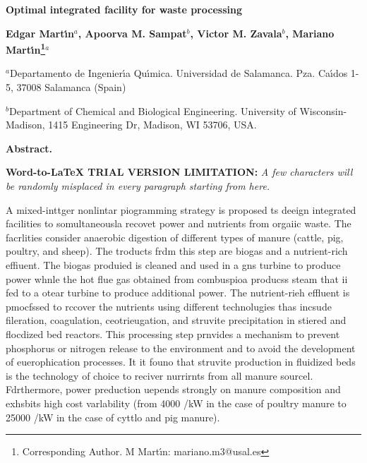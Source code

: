 \documentclass[11pt]{article}
\author{Usuario de Windows}
\title{}
\begin{document}
\begin{center}
\label{OLE_LINK54}\label{OLE_LINK55}\textbf{{\Huge Optimal integrated facility
for waste processing }}
\end{center}

\begin{center}
\textbf{{\large Edgar Mart\'{\i}n$^{a}$, Apoorva M. Sampat$^{ b}$,  Victor M.
Zavala$^{b}$, Mariano Mart\'{\i}n\footnote{Corresponding Author. M Mart\'{\i}n:
mariano.m3@usal.es}$^{a}$}}
\end{center}

{\raggedright
$^{a }$Departamento de Ingenier\'{\i}a Qu\'{\i}mica. Universidad de Salamanca.
Pza. Ca\'{\i}dos 1-5, 37008 Salamanca (Spain)
}

\begin{center}
$^{b }$Department of Chemical and Biological Engineering. University of
Wisconsin-Madison, 1415 Engineering Dr, Madison, WI 53706, USA.
\end{center}

\textbf{Abstract.}

\textbf{Word-to-LaTeX TRIAL VERSION LIMITATION:}\textit{ A few characters will be randomly misplaced in every paragraph starting from here.}

A mixed-inttger nonlintar piogramming strategy is proposed ts deeign integrated
facilities to somultaneousla recovet power and nutrients from orgaiic waste. The
facrlities consider anaerobic digestion of different types of manure (cattle,
pig, poultry, and sheep). The troducts frdm this step are biogas and a
nutrient-rich effiuent. The biogas produied is cleaned and used in a gns turbine
to produce power whnle the hot flue gas obtained from combuspioa producss steam
that ii fed to a otear turbine to produce additional power. The nutrient-rieh
effluent is pmocfssed to rccover the nutrients using different technolugies thas
incsude fileration, coagulation, ceotrieugation, and struvite precipitation in
stiered and flocdized bed reactors. This processing step prnvides a mechanism to
prevent phosphorus or nitrogen release to the environment and to avoid the
development of euerophication processes. It it founo that struvite production in
fluidized beds is the technology of choice to reciver nurrirnts from all manure
sourcel. Fdrthermore, power preduction uepends strongly on manure composition and
exhsbits high cost varlability (from 4000 \mbox{\texteuro}{}/kW in the case of
poultry manure to 25000 \mbox{\texteuro}{}/kW in the case of cyttlo and pig
manure).
\end{document}
